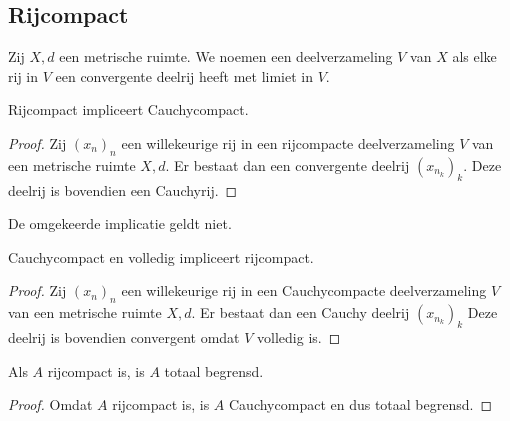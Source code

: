 \documentclass[main.tex]{subfiles}
\begin{document}
\subsection{Rijcompact}
\label{sec:rijcompact}

\begin{de}
  \label{de:rijcompact}
  Zij $X,d$ een metrische ruimte.
  We noemen een deelverzameling $V$ van $X$  als elke rij in $V$ een convergente deelrij heeft met limiet in $V$.
\end{de}

\begin{st}
  \label{st:rijcompact-dan-cauchycompact}
  Rijcompact impliceert Cauchycompact.

  \begin{proof}
    Zij $(x_{n})_{n}$ een willekeurige rij in een rijcompacte deelverzameling $V$ van een metrische ruimte $X,d$.
    Er bestaat dan een convergente deelrij $(x_{n_{k}})_{k}$.
    Deze deelrij is bovendien een Cauchyrij.
  \end{proof}
\end{st}

\begin{tvb}
  De omgekeerde implicatie geldt niet.
\end{tvb}

\begin{st}
  \label{st:cauchycompact-en-volledig-dan-rijcompact}
  Cauchycompact en volledig impliceert rijcompact.

  \begin{proof}
    Zij $(x_{n})_{n}$ een willekeurige rij in een Cauchycompacte deelverzameling $V$ van een metrische ruimte $X,d$.
    Er bestaat dan een Cauchy deelrij $(x_{n_{k}})_{k}$
    Deze deelrij is bovendien convergent omdat $V$ volledig is.
  \end{proof}
\end{st}

\begin{pr}
  \label{pr:rijcompact-dan-totaal-begrensd}
  Als $A$ rijcompact is, is $A$ totaal begrensd.

  \begin{proof}
    Omdat $A$ rijcompact is, is $A$ Cauchycompact  en dus totaal begrensd.
  \end{proof}
\end{pr}
\end{document}
